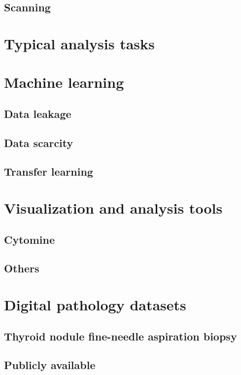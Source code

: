 \subsection{Scanning}
\label{ssec:backdp:scanning}





\section{Typical analysis tasks}
\label{sec:backdp:typicaltasks}

\section{Machine learning}
\label{sec:backdp:ml}



\subsection{Data leakage}
\label{ssec:backdp:dataleakage}

\subsection{Data scarcity}
\label{ssec:backdp:datascarcity}

\subsection{Transfer learning}
\label{ssec:backdp:tl}

\parencite{van2019strategies}

\section{Visualization and analysis tools}

\subsection{Cytomine}

\subsection{Others}

\section{Digital pathology datasets}
\label{sec:backdp:dataset}




\subsection{Thyroid nodule fine-needle aspiration biopsy}



\subsection{Publicly available}